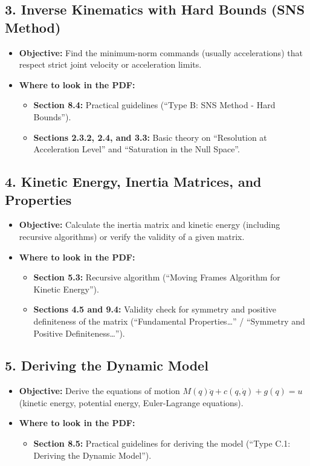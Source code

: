 \documentclass[11pt,a4paper]{article}
\begin{document}
\subsection*{3. Inverse Kinematics with Hard Bounds (SNS Method)}
\begin{itemize}
    \item \textbf{Objective:} Find the minimum-norm commands (usually accelerations) that respect strict joint velocity or acceleration limits.
    \item \textbf{Where to look in the PDF:}
    \begin{itemize}
        \item \textbf{Section 8.4:} Practical guidelines (``Type B: SNS Method - Hard Bounds'').
        \item \textbf{Sections 2.3.2, 2.4, and 3.3:} Basic theory on ``Resolution at Acceleration Level'' and ``Saturation in the Null Space''.
    \end{itemize}
\end{itemize}

\subsection*{4. Kinetic Energy, Inertia Matrices, and Properties}
\begin{itemize}
    \item \textbf{Objective:} Calculate the inertia matrix and kinetic energy (including recursive algorithms) or verify the validity of a given matrix.
    \item \textbf{Where to look in the PDF:}
    \begin{itemize}
        \item \textbf{Section 5.3:} Recursive algorithm (``Moving Frames Algorithm for Kinetic Energy'').
        \item \textbf{Sections 4.5 and 9.4:} Validity check for symmetry and positive definiteness of the matrix (``Fundamental Properties\dots'' / ``Symmetry and Positive Definiteness\dots'').
    \end{itemize}
\end{itemize}

\subsection*{5. Deriving the Dynamic Model}
\begin{itemize}
    \item \textbf{Objective:} Derive the equations of motion $M(q)\ddot{q} + c(q,\dot{q}) + g(q) = u$ (kinetic energy, potential energy, Euler-Lagrange equations).
    \item \textbf{Where to look in the PDF:}
    \begin{itemize}
        \item \textbf{Section 8.5:} Practical guidelines for deriving the model (``Type C.1: Deriving the Dynamic Model'').
    \end{itemize}
\end{itemize}
\end{document}
